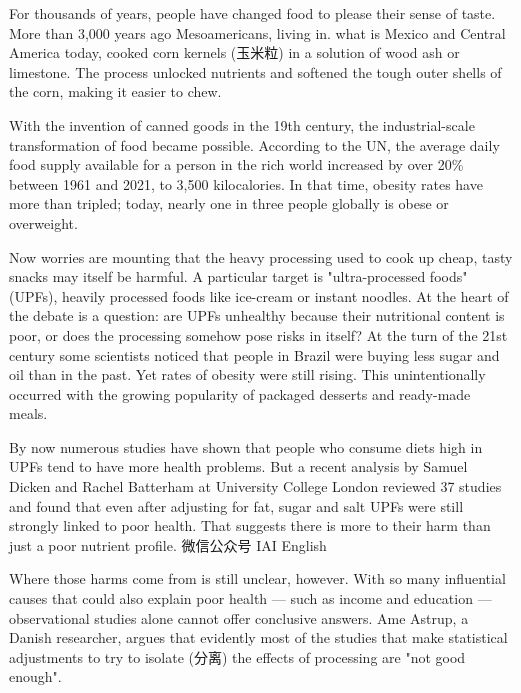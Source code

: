 \documentclass{英语试卷}
\begin{document}
\par For thousands of years, people have changed food to please their sense of taste. More than 3,000 years ago Mesoamericans, living in. what is Mexico and Central America today, cooked corn kernels (玉米粒) in a solution of wood ash or limestone. The process unlocked nutrients and softened the tough outer shells of the corn, making it easier to chew.\par
\par With the invention of canned goods in the 19th century, the industrial-scale transformation of food became possible. According to the UN, the average daily food supply available for a person in the rich world increased by over 20\% between 1961 and 2021, to 3,500 kilocalories. In that time, obesity rates have more than tripled; today, nearly one in three people globally is obese or overweight.\par
\par Now worries are mounting that the heavy processing used to cook up cheap, tasty snacks may itself be harmful. A particular target is "ultra-processed foods" (UPFs), heavily processed foods like ice-cream or instant noodles. At the heart of the debate is a question: are UPFs unhealthy because their nutritional content is poor, or does the processing somehow pose risks in itself? At the turn of the 21st century some scientists noticed that people in Brazil were buying less sugar and oil than in the past. Yet rates of obesity were still rising. This unintentionally occurred with the growing popularity of packaged desserts and ready-made meals.\par
\par By now numerous studies have shown that people who consume diets high in UPFs tend to have more health problems. But a recent analysis by Samuel Dicken and Rachel Batterham at University College London reviewed 37 studies and found that even after adjusting for fat, sugar and salt UPFs were still strongly linked to poor health. That suggests there is more to their harm than just a poor nutrient profile. 微信公众号 IAI English\par
\par Where those harms come from is still unclear, however. With so many influential causes that could also explain poor health — such as income and education — observational studies alone cannot offer conclusive answers. Ame Astrup, a Danish researcher, argues that evidently most of the studies that make statistical adjustments to try to isolate (分离) the effects of processing are "not good enough".\par
\end{document}
